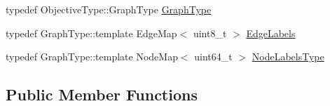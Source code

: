\begin{DoxyCompactItemize}
\item 
typedef Objective\+Type\+::\+Graph\+Type \hyperlink{classnifty_1_1graph_1_1opt_1_1multicut_1_1PyMulticutBase_ad6ea80fce39a1ae65b932a9ad293ec83}{Graph\+Type}
\item 
typedef Graph\+Type\+::template Edge\+Map$<$ uint8\+\_\+t $>$ \hyperlink{classnifty_1_1graph_1_1opt_1_1multicut_1_1PyMulticutBase_a326edf5f82eb28bfb7ce464b4056e9e8}{Edge\+Labels}
\item 
typedef Graph\+Type\+::template Node\+Map$<$ uint64\+\_\+t $>$ \hyperlink{classnifty_1_1graph_1_1opt_1_1multicut_1_1PyMulticutBase_a34b9d7a58d056154c6b1abe7a83297c6}{Node\+Labels\+Type}
\end{DoxyCompactItemize}
\subsection*{Public Member Functions}
